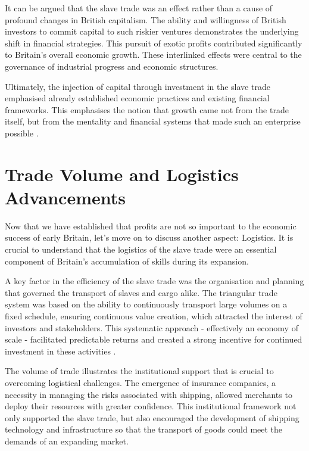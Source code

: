 \documentclass[a4paper,11pt]{article}
\begin{document}
It can be argued that the slave trade was an effect rather than a cause of profound changes in British capitalism. The ability and willingness of British investors to commit capital to such riskier ventures demonstrates the underlying shift in financial strategies. This pursuit of exotic profits contributed significantly to Britain's overall economic growth. These interlinked effects were central to the governance of industrial progress and economic structures.

Ultimately, the injection of capital through investment in the slave trade emphasised already established economic practices and existing financial frameworks. This emphasises the notion that growth came not from the trade itself, but from the mentality and financial systems that made such an enterprise possible \citep{harley2015}.

\section{Trade Volume and Logistics Advancements}

Now that we have established that profits are not so important to the economic success of early Britain, let's move on to discuss another aspect: Logistics. It is crucial to understand that the logistics of the slave trade were an essential component of Britain's accumulation of skills during its expansion.

A key factor in the efficiency of the slave trade was the organisation and planning that governed the transport of slaves and cargo alike. The triangular trade system was based on the ability to continuously transport large volumes on a fixed schedule, ensuring continuous value creation, which attracted the interest of investors and stakeholders. This systematic approach - effectively an economy of scale - facilitated predictable returns and created a strong incentive for continued investment in these activities \citep{harley2015}.

The volume of trade illustrates the institutional support that is crucial to overcoming logistical challenges. The emergence of insurance companies, a necessity in managing the risks associated with shipping, allowed merchants to deploy their resources with greater confidence. This institutional framework not only supported the slave trade, but also encouraged the development of shipping technology and infrastructure so that the transport of goods could meet the demands of an expanding market.
\end{document}
